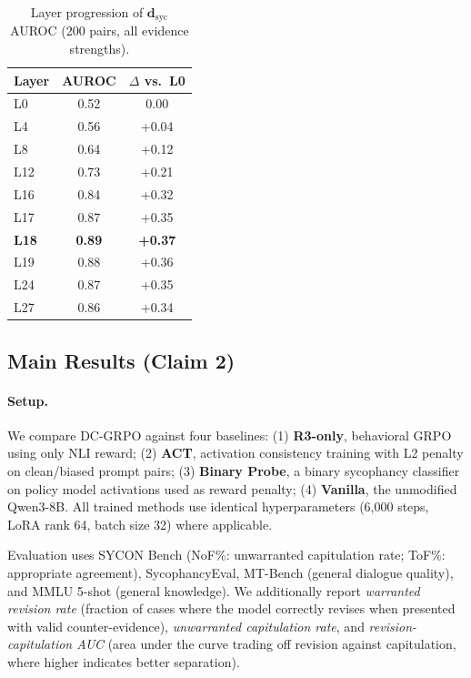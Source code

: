 \documentclass[11pt]{article}
\begin{document}
\begin{table}[h]
\centering
\caption{Layer progression of $\mathbf{d}_\text{syc}$ AUROC (200 pairs, all evidence strengths).}
\label{tab:layer_progression}
\begin{tabular}{lcc}
\toprule
Layer & AUROC & $\Delta$ vs.\ L0 \\
\midrule
L0  & 0.52 & 0.00 \\
L4  & 0.56 & +0.04 \\
L8  & 0.64 & +0.12 \\
L12 & 0.73 & +0.21 \\
L16 & 0.84 & +0.32 \\
L17 & 0.87 & +0.35 \\
\textbf{L18} & \textbf{0.89} & \textbf{+0.37} \\
L19 & 0.88 & +0.36 \\
L24 & 0.87 & +0.35 \\
L27 & 0.86 & +0.34 \\
\bottomrule
\end{tabular}
\end{table}

\subsection{Main Results (Claim 2)}
\label{sec:main_results}

\paragraph{Setup.}
We compare DC-GRPO against four baselines: (1) \textbf{R3-only}, behavioral GRPO using only NLI reward; (2) \textbf{ACT}, activation consistency training with L2 penalty on clean/biased prompt pairs; (3) \textbf{Binary Probe}, a binary sycophancy classifier on policy model activations used as reward penalty; (4) \textbf{Vanilla}, the unmodified Qwen3-8B. All trained methods use identical hyperparameters (6,000 steps, LoRA rank 64, batch size 32) where applicable.

Evaluation uses SYCON Bench (NoF\%: unwarranted capitulation rate; ToF\%: appropriate agreement), SycophancyEval, MT-Bench (general dialogue quality), and MMLU 5-shot (general knowledge). We additionally report \emph{warranted revision rate} (fraction of cases where the model correctly revises when presented with valid counter-evidence), \emph{unwarranted capitulation rate}, and \emph{revision-capitulation AUC} (area under the curve trading off revision against capitulation, where higher indicates better separation).
\end{document}
